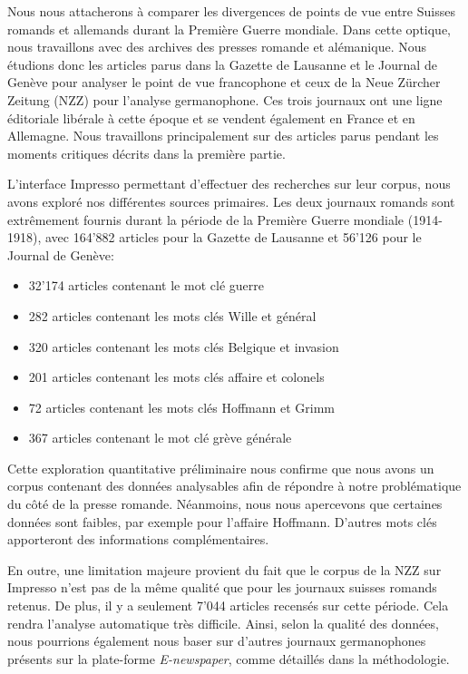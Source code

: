 \documentclass[french,a4paper]{article}
\begin{document}
Nous nous attacherons à comparer les divergences de points de vue entre Suisses romands et allemands durant la Première Guerre mondiale.
Dans cette optique, nous travaillons avec des archives des presses romande et alémanique.
Nous étudions donc les articles parus dans la Gazette de Lausanne et le Journal de Genève pour analyser le point de vue francophone et ceux de la Neue Zürcher Zeitung (NZZ) pour l’analyse germanophone.
Ces trois journaux ont une ligne éditoriale libérale \cite{clavien} à cette époque et se vendent également en France et en Allemagne.
Nous travaillons principalement sur des articles parus pendant les moments critiques décrits dans la première partie.

L'interface Impresso permettant d'effectuer des recherches sur leur corpus, nous avons exploré nos différentes sources primaires.
Les deux journaux romands sont extrêmement fournis durant la période de la Première Guerre mondiale (1914-1918), avec 164'882 articles pour la Gazette de Lausanne et 56'126 pour le Journal de Genève:

\begin{itemize}
    \item 32'174 articles contenant le mot clé \og guerre \fg{}
    \item 282 articles contenant les mots clés \og Wille \fg{} et \og général \fg{}
    \item 320 articles contenant les mots clés \og Belgique \fg{} et \og invasion \fg{}
    \item 201 articles contenant les mots clés \og affaire \fg{} et \og colonels \fg{}
    \item 72 articles contenant les mots clés \og Hoffmann \fg{} et \og Grimm \fg{}
    \item 367 articles contenant le mot clé \og grève générale \fg{}
\end{itemize}

Cette exploration quantitative préliminaire nous confirme que nous avons un corpus contenant des données analysables afin de répondre à notre problématique du côté de la presse romande.
Néanmoins, nous nous apercevons que certaines données sont faibles, par exemple pour l'affaire Hoffmann.
D'autres mots clés apporteront des informations complémentaires.

En outre, une limitation majeure provient du fait que le corpus de la NZZ sur Impresso n'est pas de la même qualité que pour les journaux suisses romands retenus.
De plus, il y a seulement 7'044 articles recensés sur cette période.
Cela rendra l'analyse automatique très difficile.
Ainsi, selon la qualité des données, nous pourrions également nous baser sur d'autres journaux germanophones présents sur la plate-forme \textit{E-newspaper}, comme détaillés dans la méthodologie.
\end{document}

